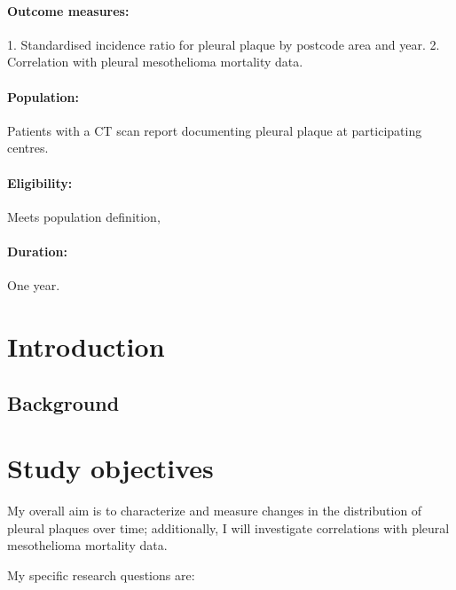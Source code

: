 \documentclass[a4paper,10pt]{article}
\begin{document}
\paragraph{Outcome measures:} 1. Standardised incidence ratio for pleural plaque by postcode area and year. 2. Correlation with pleural mesothelioma mortality data.
\paragraph{Population:} Patients with a CT scan report documenting pleural plaque at participating centres.
\paragraph{Eligibility:} Meets population definition,
\paragraph{Duration:} One year.


\newpage


\section{Introduction}
\subsection{Background}


\section{Study objectives}

My overall aim is to characterize and measure changes in the distribution of pleural plaques over time; additionally, I will investigate correlations with pleural mesothelioma mortality data.

My specific research questions are:
\end{document}
